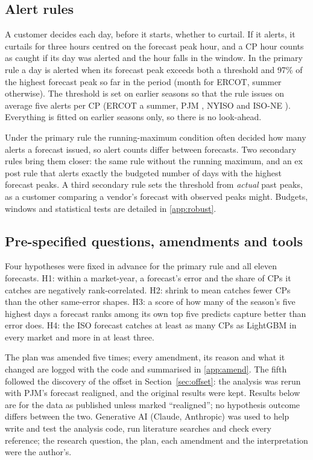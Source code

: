 \documentclass[preprint,12pt,authoryear]{elsarticle}
\begin{document}
\subsection{Alert rules}

A customer decides each day, before it starts, whether to curtail. If it alerts, it curtails for three hours centred on the forecast peak hour, and a CP hour counts as caught if its day was alerted and the hour falls in the window. In the primary rule a day is alerted when its forecast peak exceeds both a threshold and 97\% of the highest forecast peak so far in the period (month for ERCOT, summer otherwise). The threshold is set on earlier seasons so that the rule issues on average five alerts per CP (ERCOT  a summer, PJM , NYISO and ISO-NE ). Everything is fitted on earlier seasons only, so there is no look-ahead.

Under the primary rule the running-maximum condition often decided how many alerts a forecast issued, so alert counts differ between forecasts. Two secondary rules bring them closer: the same rule without the running maximum, and an ex post rule that alerts exactly the budgeted number of days with the highest forecast peaks. A third secondary rule sets the threshold from \emph{actual} past peaks, as a customer comparing a vendor's forecast with observed peaks might. Budgets, windows and statistical tests are detailed in \ref{app:robust}.

\subsection{Pre-specified questions, amendments and tools}

Four hypotheses were fixed in advance for the primary rule and all eleven forecasts. H1: within a market-year, a forecast's error and the share of CPs it catches are negatively rank-correlated. H2: shrink to mean catches fewer CPs than the other same-error shapes. H3: a score of how many of the season's five highest days a forecast ranks among its own top five predicts capture better than error does. H4: the ISO forecast catches at least as many CPs as LightGBM in every market and more in at least three.

The plan was amended five times; every amendment, its reason and what it changed are logged with the code and summarised in \ref{app:amend}. The fifth followed the discovery of the offset in Section~\ref{sec:offset}: the analysis was rerun with PJM's forecast realigned, and the original results were kept. Results below are for the data as published unless marked ``realigned''; no hypothesis outcome differs between the two. Generative AI (Claude, Anthropic) was used to help write and test the analysis code, run literature searches and check every reference; the research question, the plan, each amendment and the interpretation were the author's.
\end{document}
